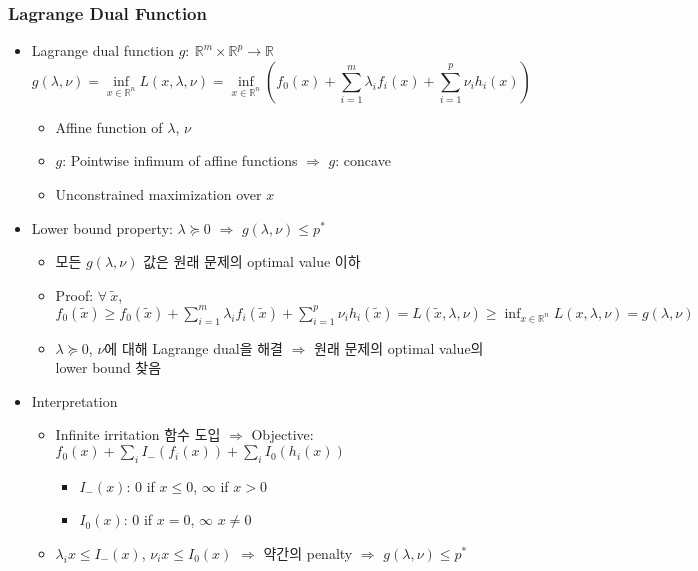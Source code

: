 \subsubsection*{Lagrange Dual Function}
\begin{itemize}
    \item Lagrange dual function $g:~\mathbb{R}^m\times\mathbb{R}^p\rightarrow\mathbb{R}$
        $$ g(\lambda,\nu) = \inf_{x\in\mathbb{R}^n}L(x,\lambda,\nu)
            = \inf_{x\in\mathbb{R}^n}\left(f_0(x) + \sum_{i=1}^m \lambda_i f_i(x) + \sum_{i=1}^p\nu_i h_i(x)\right) $$
    \begin{itemize}
        \item Affine function of $\lambda$, $\nu$
        \item $g$: Pointwise infimum of affine functions $\Rightarrow$ $g$: concave
        \item Unconstrained maximization over $x$
    \end{itemize}
    \item Lower bound property: $\lambda\succeq 0$ $\Rightarrow$ $g(\lambda,\nu)\leq p^{\ast}$
    \begin{itemize}
        \item 모든 $g(\lambda,\nu)$ 값은 원래 문제의 optimal value 이하
        \item Proof: $\forall~\tilde{x}$, $f_0(\tilde{x})\geq f_0(\tilde{x})+\sum_{i=1}^m\lambda_if_i(\tilde{x})+\sum_{i=1}^p\nu_ih_i(\tilde{x})=L(\tilde{x},\lambda,\nu)\geq\inf_{x\in\mathbb{R}^n}L(x,\lambda,\nu)=g(\lambda,\nu)$
        \item $\lambda\succeq 0$, $\nu$에 대해 Lagrange dual을 해결 $\Rightarrow$ 원래 문제의 optimal value의 lower bound 찾음
    \end{itemize}
    \item Interpretation
    \begin{itemize}
        \item Infinite irritation 함수 도입 $\Rightarrow$ Objective: $f_0(x)+\sum_iI_-(f_i(x))+\sum_iI_0(h_i(x))$
        \begin{itemize}
            \item $I_-(x)$: $0$ if $x\leq 0$, $\infty$ if $x>0$
            \item $I_0(x)$: $0$ if $x=0$, $\infty$ $x\neq 0$
        \end{itemize}
        \item $\lambda_ix\leq I_-(x)$, $\nu_ix\leq I_0(x)$ $\Rightarrow$ 약간의 penalty $\Rightarrow$ $g(\lambda,\nu)\leq p^{\ast}$
    \end{itemize}
    \begin{figures}
    \end{figures}
\end{itemize}

